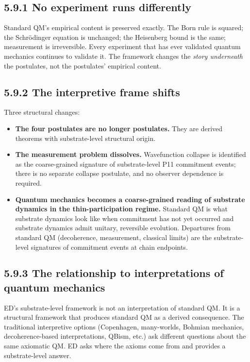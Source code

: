 \documentclass[11pt]{book}
\begin{document}
\subsection{5.9.1 No experiment runs differently}

Standard QM's empirical content is preserved exactly. The Born rule is squared; the Schrödinger equation is unchanged; the Heisenberg bound is the same; measurement is irreversible. Every experiment that has ever validated quantum mechanics continues to validate it. The framework changes the \textit{story underneath} the postulates, not the postulates' empirical content.

\subsection{5.9.2 The interpretive frame shifts}

Three structural changes:

\begin{itemize}
\item \textbf{The four postulates are no longer postulates.} They are derived theorems with substrate-level structural origin.
\item \textbf{The measurement problem dissolves.} Wavefunction collapse is identified as the coarse-grained signature of substrate-level P11 commitment events; there is no separate collapse postulate, and no observer dependence is required.
\item \textbf{Quantum mechanics becomes a coarse-grained reading of substrate dynamics in the thin-participation regime.} Standard QM is what substrate dynamics look like when commitment has not yet occurred and substrate dynamics admit unitary, reversible evolution. Departures from standard QM (decoherence, measurement, classical limits) are the substrate-level signatures of commitment events at chain endpoints.
\end{itemize}

\subsection{5.9.3 The relationship to interpretations of quantum mechanics}

ED's substrate-level framework is not an interpretation of standard QM. It is a structural framework that produces standard QM as a derived consequence. The traditional interpretive options (Copenhagen, many-worlds, Bohmian mechanics, decoherence-based interpretations, QBism, etc.) ask different questions about the same axiomatic QM. ED asks where the axioms come from and provides a substrate-level answer.
\end{document}
